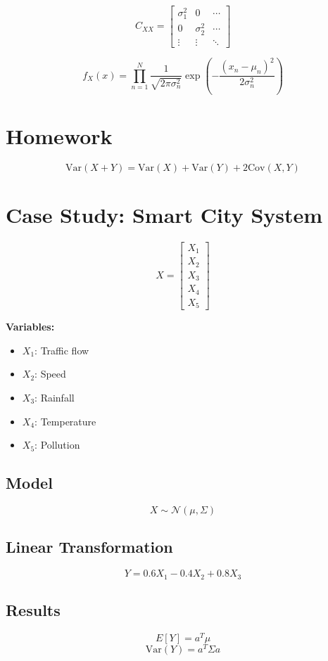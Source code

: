 \documentclass{article}
\begin{document}
\[
C_{XX} =
\begin{bmatrix}
\sigma_1^2 & 0 & \cdots \\
0 & \sigma_2^2 & \cdots \\
\vdots & \vdots & \ddots
\end{bmatrix}
\]

\[
f_X(x) = \prod_{n=1}^{N}
\frac{1}{\sqrt{2\pi\sigma_n^2}}
\exp\left(-\frac{(x_n-\mu_n)^2}{2\sigma_n^2}\right)
\]

\section{Homework}

\[
\boxed{\mathrm{Var}(X+Y) = \mathrm{Var}(X) + \mathrm{Var}(Y) + 2\mathrm{Cov}(X,Y)}
\]

\section{Case Study: Smart City System}

\[
X =
\begin{bmatrix}
X_1 \\ X_2 \\ X_3 \\ X_4 \\ X_5
\end{bmatrix}
\]

\textbf{Variables:}
\begin{itemize}
    \item $X_1$: Traffic flow
    \item $X_2$: Speed
    \item $X_3$: Rainfall
    \item $X_4$: Temperature
    \item $X_5$: Pollution
\end{itemize}

\subsection{Model}
\[
X \sim \mathcal{N}(\mu,\Sigma)
\]

\subsection{Linear Transformation}
\[
Y = 0.6X_1 - 0.4X_2 + 0.8X_3
\]

\subsection{Results}
\[
E[Y] = a^T \mu
\]
\[
\mathrm{Var}(Y) = a^T \Sigma a
\]
\end{document}
